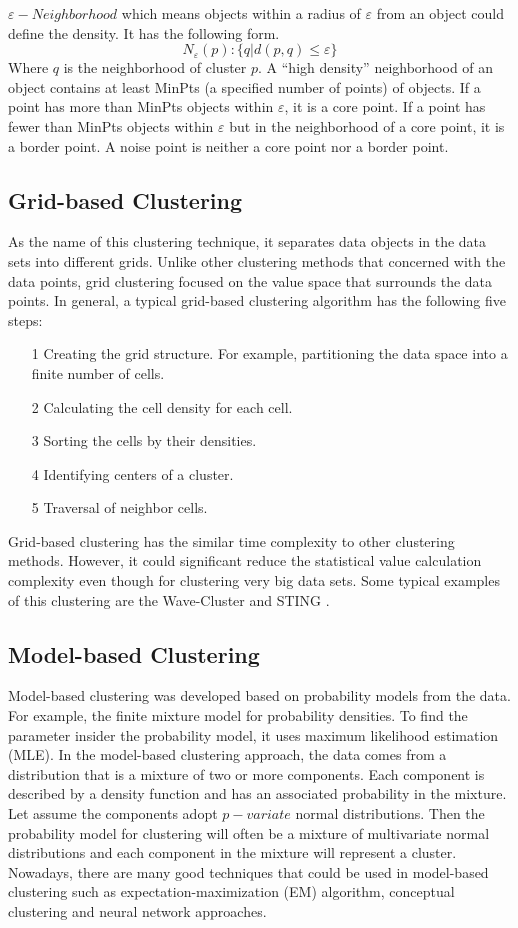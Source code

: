 \documentclass[sigconf]{acmart}
\begin{document}
$\varepsilon-Neighborhood$ which means objects within a radius of $\varepsilon$ from an object could define the density. It has the following form.
\[N_{\varepsilon}(p):\{q \vert d(p,q)\leq \varepsilon\}\]
Where $q$ is the neighborhood of cluster $p$. A ``high density'' neighborhood of an object contains at least MinPts (a specified number of points) of objects. If a point has more than MinPts objects within $\varepsilon$, it is a core point. If a point has fewer than MinPts objects within $\varepsilon$ but in the neighborhood of a core point, it is a border point. A noise point is neither a core point nor a border point.

\subsection{Grid-based Clustering}

As the name of this clustering technique, it separates data objects in the data sets into different grids. Unlike other clustering methods that concerned with the data points, grid clustering focused on the value space that surrounds the data points. In general, a typical grid-based clustering algorithm has the following five steps:
\begin{itemize}
\item[1] Creating the grid structure. For example, partitioning the data space into a finite number of cells.
\item[2] Calculating the cell density for each cell.
\item[3] Sorting the cells by their densities.
\item[4] Identifying centers of a cluster.
\item[5] Traversal of neighbor cells.
\end{itemize}

Grid-based clustering has the similar time complexity to other clustering methods. However, it could significant reduce the statistical value calculation complexity even though for clustering very big data sets. Some typical examples of this clustering are the Wave-Cluster and STING \cite{dcar}.

\subsection{Model-based Clustering}

Model-based clustering was developed based on probability models from the data. For example, the finite mixture model for probability densities. To find the parameter insider the probability model, it uses maximum likelihood estimation (MLE). In the model-based clustering approach, the data comes from a distribution that is a mixture of two or more components. Each component is described by a density function and has an associated probability in the mixture. Let assume the components adopt $p-variate$ normal distributions. Then the probability model for clustering will often be a mixture of multivariate normal distributions and each component in the mixture will represent a cluster. Nowadays, there are many good techniques that could be used in model-based clustering such as expectation-maximization (EM) algorithm, conceptual clustering and neural network approaches.
\end{document}
